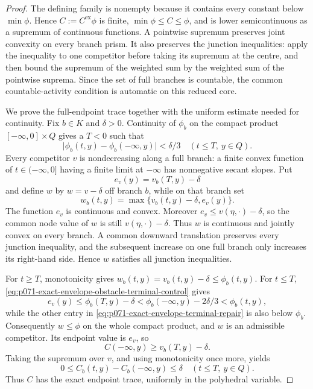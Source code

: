\begin{proof}
The defining family is nonempty because it contains every constant below
\(\min\phi\).  Hence \(C:=C^{\mathrm{ex}}\phi\) is finite,
\(\min\phi\leq C\leq\phi\), and is lower semicontinuous as a supremum of
continuous functions.  A pointwise supremum preserves joint convexity on
every branch prism.  It also preserves the junction inequalities: apply the
inequality to one competitor before taking its supremum at the centre, and
then bound the supremum of the weighted sum by the weighted sum of the
pointwise suprema.  Since the set of full branches is countable, the common
countable-activity condition is automatic on this reduced core.

We prove the full-endpoint trace together with the uniform estimate needed
for continuity.  Fix \(b\in K\) and \(\delta>0\).  Continuity of \(\phi_b\)
on the compact product \([-\infty,0]\times Q\) gives a \(T<0\) such that
\begin{equation}
 \lvert\phi_b(t,y)-\phi_b(-\infty,y)\rvert<\delta/3
 \quad(t\leq T,\ y\in Q).
 \label{eq:p071-exact-envelope-obstacle-terminal-control}
\end{equation}
Every competitor \(v\) is nondecreasing along a full branch: a finite convex
function of \(t\in(-\infty,0]\) having a finite limit at \(-\infty\) has
nonnegative secant slopes.  Put
\[
                         e_v(y)=v_b(T,y)-\delta
\]
and define \(w\) by \(w=v-\delta\) off branch \(b\), while on that branch
set
\begin{equation}
                  w_b(t,y)=
          \max\{v_b(t,y)-\delta,e_v(y)\}.
 \label{eq:p071-exact-envelope-terminal-repair}
\end{equation}
The function \(e_v\) is continuous and convex.  Moreover
\(e_v\leq v(\eta,\cdot)-\delta\), so the common node value of \(w\) is
still \(v(\eta,\cdot)-\delta\).  Thus \(w\) is continuous and jointly
convex on every branch.  A common downward translation preserves every
junction inequality, and the subsequent increase on one full branch only
increases its right-hand side.  Hence \(w\) satisfies all junction
inequalities.

For \(t\geq T\), monotonicity gives
\(w_b(t,y)=v_b(t,y)-\delta\leq\phi_b(t,y)\).  For \(t\leq T\),
\eqref{eq:p071-exact-envelope-obstacle-terminal-control} gives
\[
 e_v(y)\leq\phi_b(T,y)-\delta
 <\phi_b(-\infty,y)-2\delta/3
 <\phi_b(t,y),
\]
while the other entry in
\eqref{eq:p071-exact-envelope-terminal-repair} is also below \(\phi_b\).
Consequently \(w\leq\phi\) on the whole compact product, and \(w\) is an
admissible competitor.  Its endpoint value is \(e_v\), so
\[
 C(-\infty,y)\geq v_b(T,y)-\delta.
\]
Taking the supremum over \(v\), and using monotonicity once more, yields
\begin{equation}
 0\leq C_b(t,y)-C_b(-\infty,y)\leq\delta
 \quad(t\leq T,\ y\in Q).
 \label{eq:p071-exact-envelope-uniform-terminal-trace}
\end{equation}
Thus \(C\) has the exact endpoint trace, uniformly in the polyhedral
variable.


\end{proof}
